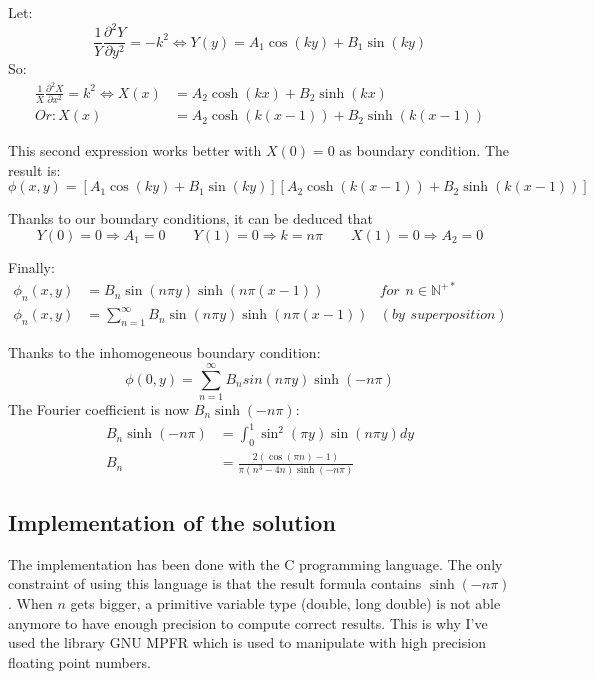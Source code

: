 \documentclass[a4paper,11pt]{article}
\begin{document}
\noindent Let: $$\frac{1}{Y}\frac{\partial^2 Y}{\partial y^2} = - k^2 \Leftrightarrow Y(y) = A_1\cos(k y) + B_1\sin(k y)$$ 
So:
\begin{align*}
  \frac{1}{X}\frac{\partial^2 X}{\partial x^2} = k^2 \Leftrightarrow X(x) & = A_2\cosh(k x) + B_2\sinh(k x) \\
  Or: X(x) & = A_2\cosh(k (x-1)) + B_2\sinh(k (x-1))
\end{align*}

\noindent This second expression works better with $X(0) = 0$ as boundary condition. The result is:
$$\phi(x,y) = [ A_1\cos(k y) + B_1\sin(k y)][A_2\cosh(k (x-1)) + B_2\sinh(k (x-1))]$$

\noindent Thanks to our boundary conditions, it can be deduced that
$$Y(0) = 0 \Rightarrow A_1=0 \hspace{2em} Y(1) = 0 \Rightarrow k=n \pi \hspace{2em} X(1) = 0 \Rightarrow A_2 = 0$$

\noindent Finally:
\begin{align*}
  \phi_n(x,y) & = B_n \sin(n \pi y)\sinh(n \pi (x-1)) & for\hspace{5pt}n \in \mathbb{N}^{+*} \\
  \phi_n(x,y) & = \sum_{n = 1}^{\infty}{B_n \sin(n \pi y)\sinh(n \pi (x-1))} & (by\hspace{5pt}superposition)
\end{align*}

\noindent Thanks to the inhomogeneous boundary condition:
\[
  \phi(0, y) = \sum_{n = 1}^{\infty}{B_n sin(n \pi y)\sinh(-n \pi)}
\]
The Fourier coefficient is now $B_n \sinh(-n \pi)$:
\begin{align*}
  B_n \sinh(-n \pi) & = \int_{0}^{1}{\sin^2(\pi y)\sin(n \pi y)dy} \\
  B_n & = \frac{2(\cos(\pi n) - 1)}{\pi(n^3 - 4n)\sinh(-n \pi)}
\end{align*}

\subsection{Implementation of the solution}
  The implementation has been done with the C programming language. The only constraint of using this language is
  that the result formula contains $\sinh(-n \pi)$. When $n$ gets bigger, a primitive variable type (double, long double)
  is not able anymore to have enough precision to compute correct results. This is why I've used the library
  GNU MPFR which is used to manipulate with high precision floating point numbers.
  
\end{document}
